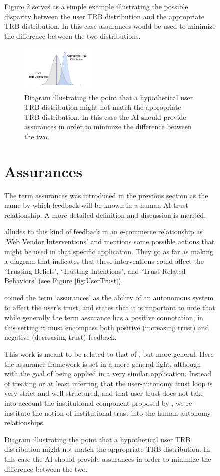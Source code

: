 \begin{figure}[htbp]
    Figure \ref{fig:SimpleTrust_dist} serves as a simple example illustrating the possible disparity between the user TRB distribution and the appropriate TRB distribution. In this case assurances would be used to minimize the difference between the two distributions.

	\begin{figure}[htbp]
    	\centering
     	\includegraphics[width=0.4\textwidth]{Figures/SimpleTrust_dist.png}
    	\caption{Diagram illustrating the point that a hypothetical user TRB distribution might not match the appropriate TRB distribution. In this case the AI should provide assurances in order to minimize the difference between the two.}
        \label{fig:SimpleTrust_dist}
    \end{figure}


\section{Assurances}
    The term assurances was introduced in the previous section as the name by which feedback will be known in a human-AI trust relationship. A more detailed definition and discussion is merited.

    \citet{McKnight2001-fa} alludes to this kind of feedback in an e-commerce relationship as `Web Vendor Interventions' and mentions some possible actions that might be used in that specific application. They go as far as making a diagram that indicates that these interventions could affect the `Trusting Beliefs', `Trusting Intentions', and `Trust-Related Behaviors' (see Figure \ref{fig:UserTrust}).
    
    \citet{Lillard2016-yg} coined the term `assurances' as the ability of an autonomous system to affect the user's trust, and states that it is important to note that while generally the term assurance has a positive connotation; in this setting it must encompass both positive (increasing trust) and negative (decreasing trust) feedback.

    This work is meant to be related to that of \citet{Lillard2016-yg}, but more general. Here the assurance framework is set in a more general light, although with the goal of being applied in a very similar application. Instead of treating or at least inferring that the user-autonomy trust loop is very strict and well structured, and that user trust does not take into account the institutional component proposed by \citet{McKnight2001-fa}, we re-institute the notion of institutional trust into the human-autonomy relationships.


\end{figure}
